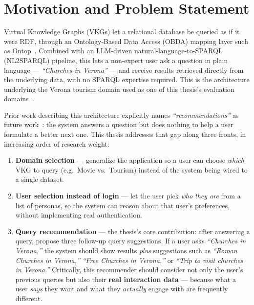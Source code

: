 \section{Motivation and Problem Statement}
\label{sec:intro-motivation}

Virtual Knowledge Graphs (VKGs) let a relational database be queried as if it were RDF, through an
Ontology-Based Data Access (OBDA) mapping layer such as Ontop~\cite{ontop}. Combined with an
LLM-driven natural-language-to-SPARQL (NL2SPARQL) pipeline, this lets a non-expert user ask a
question in plain language --- \emph{``Churches in Verona''} --- and receive results retrieved
directly from the underlying data, with no SPARQL expertise required. This is the architecture
underlying the Verona tourism domain used as one of this thesis's evaluation
domains~\cite{balasooriya2026}.

Prior work describing this architecture explicitly names \emph{``recommendations''} as future
work~\cite{balasooriya2026}: the system answers a question but does nothing to help a user
formulate a better next one. This thesis addresses that gap along three fronts, in increasing
order of research weight:

\begin{enumerate}[label=(\arabic*)]
    \item \textbf{Domain selection} --- generalize the application so a user can choose \emph{which}
        VKG to query (e.g.\ Movie vs.\ Tourism) instead of the system being wired to a single
        dataset.
    \item \textbf{User selection instead of login} --- let the user pick \emph{who they are} from a
        list of personas, so the system can reason about that user's preferences, without
        implementing real authentication.
    \item \textbf{Query recommendation} --- the thesis's core contribution: after answering a
        query, propose three follow-up query suggestions. If a user asks \emph{``Churches in
        Verona,''} the system should show results \emph{plus} suggestions such as \emph{``Roman
        Churches in Verona,''} \emph{``Free Churches in Verona,''} or \emph{``Trip to visit churches
        in Verona.''} Critically, this recommender should consider not only the user's previous
        queries but also their \textbf{real interaction data} --- because what a user \emph{says}
        they want and what they \emph{actually} engage with are frequently different.
\end{enumerate}

